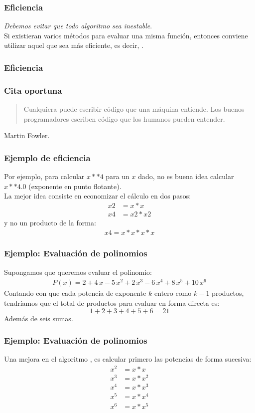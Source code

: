 \documentclass[12pt]{beamer}
\begin{document}
\begin{frame}
\frametitle{Eficiencia}
\emph{Debemos evitar que todo algoritmo sea inestable}. 
\\
\bigskip
Si existieran varios métodos para evaluar una misma función, entonces conviene utilizar aquel que sea más eficiente, \pause es decir, .
\end{frame}
\begin{frame}
\frametitle{Eficiencia}
\end{frame}
\begin{frame}
\frametitle{Cita oportuna}
\begin{quote}
Cualquiera puede escribir código que una máquina entiende. Los buenos programadores escriben código que los humanos pueden entender.
\end{quote}
Martin Fowler.
\end{frame}
\begin{frame}
\frametitle{Ejemplo de eficiencia}
Por ejemplo, para calcular $x**4$ para un $x$ dado, no es buena idea calcular $x**4.0$ (exponente en punto flotante).
\\
\bigskip
\pause
La mejor idea consiste en economizar el cálculo en dos pasos:
\begin{align*}
x2 &= x*x \\
x4 &= x2*x2
\end{align*}
\pause
y no un producto de la forma:
\begin{align*}
x4 = x*x*x*x
\end{align*}
\end{frame}
\begin{frame}
\frametitle{Ejemplo: Evaluación de polinomios}
Supongamos que queremos evaluar el polinomio:
\pause
\begin{align*}
P (x) = 2 + 4 \, x - 5\, x^{2} + 2\,  x^{3} - 6 \, x^{4} + 8 \, x^{5} + 10 \, x^{6}
\end{align*}
\pause
Contando con que cada potencia de exponente $k$ entero como $k-1$ productos, tendríamos que el total de productos para evaluar en forma directa es:
\[ 1+2+3+4+5+6=21\]
Además de seis sumas.
\end{frame}
\begin{frame}
\frametitle{Ejemplo: Evaluación de polinomios}
Una mejora en el algoritmo , es calcular primero las potencias de forma sucesiva:
\begin{align*}
x^{2} & = x*x \\
x^{3} & = x*x^{2} \\
x^{4} & = x*x^{3} \\
x^{5} & = x*x^{4} \\
x^{6} & = x*x^{5}
\end{align*}
\end{frame}
\end{document}
